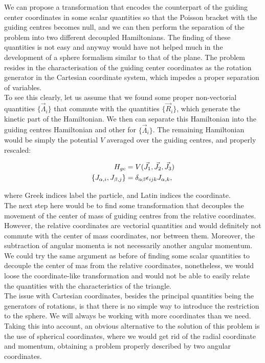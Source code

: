 We can propose a transformation that encodes the counterpart of the guiding center coordinates in some scalar quantities so that the Poisson bracket with the guiding centres becomes null, and we can then perform the separation of the problem into two different decoupled Hamiltonians. The finding of these quantities is not easy and anyway would have not helped much in the development of a sphere formalism similar to that of the plane. The problem resides in the characterisation of the guiding center coordinates as the rotation generator in the Cartesian coordinate system, which impedes a proper separation of variables.\\

To see this clearly, let us assume that we found some proper non-vectorial quantities $\{\vec{\Lambda}_i\}$ that commute with the quantities $\{\vec{R}_i\}$, which generate the kinetic part of the Hamiltonian. We then can separate this Hamiltonian into the guiding centres Hamiltonian and other for $\{\vec{\Lambda}_i\}$. The remaining Hamiltonian would be simply the potential $V$ averaged over the guiding centres, and properly rescaled:

\begin{align*}
H_{gc} &= V(\vec{J_1},\vec{J_2},\vec{J_3})\\
\left\lbrace J_{\alpha,i}, J_{\beta,j} \right\rbrace &= \delta_{\alpha\beta}\epsilon_{ijk} J_{\alpha,k},
\end{align*}

where Greek indices label the particle, and Latin indices the coordinate. \\

The next step here would be to find some transformation that decouples the movement of the center of mass of guiding centres from the relative coordinates. However, the relative coordinates are vectorial quantities and would definitely not commute with the center of mass coordinates, nor between them. Moreover, the subtraction of angular momenta is not necessarily another angular momentum. \\

We could try the same argument as before of finding some scalar quantities to decouple the center of mas from the relative coordinates, nonetheless, we would loose the coordinate-like transformation and would not be able to easily relate the quantities with the characteristics of the triangle.\\

The issue with Cartesian coordinates, besides the principal quantities being the generators of rotations, is that there is no simple way to introduce the restriction to the sphere. We will always be working with more coordinates than we need. Taking this into account, an obvious alternative to the solution of this problem is the use of spherical coordinates, where we would get rid of the radial coordinate and momentum, obtaining a problem properly described by two angular coordinates.\\ 


